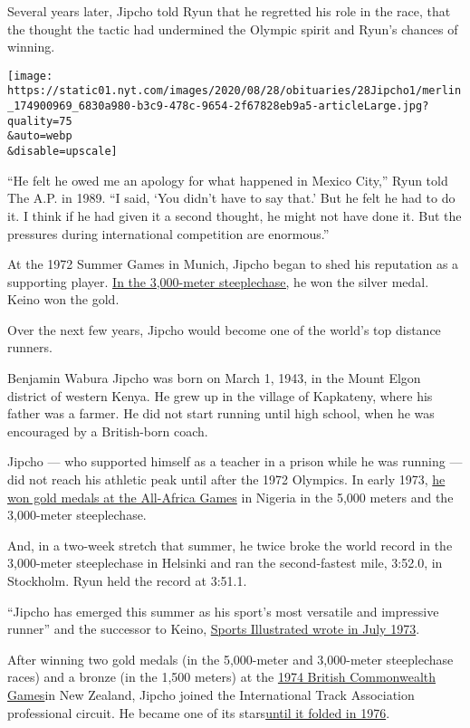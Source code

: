 Several years later, Jipcho told Ryun that he regretted his role in the
race, that the thought the tactic had undermined the Olympic spirit and
Ryun's chances of winning.

\texttt{[image: https://static01.nyt.com/images/2020/08/28/obituaries/28Jipcho1/merlin\_174900969\_6830a980-b3c9-478c-9654-2f67828eb9a5-articleLarge.jpg?quality=75\\\&auto=webp\\\&disable=upscale]}

``He felt he owed me an apology for what happened in Mexico City,'' Ryun
told The A.P. in 1989. ``I said, `You didn't have to say that.' But he
felt he had to do it. I think if he had given it a second thought, he
might not have done it. But the pressures during international
competition are enormous.''

At the 1972 Summer Games in Munich, Jipcho began to shed his reputation
as a supporting player.
\href{https://web.archive.org/web/20200417174448/https://www.sports-reference.com/olympics/athletes/ji/ben-jipcho-1.html}{In
the 3,000-meter steeplechase,} he won the silver medal. Keino won the
gold.

Over the next few years, Jipcho would become one of the world's top
distance runners.

Benjamin Wabura Jipcho was born on March 1, 1943, in the Mount Elgon
district of western Kenya. He grew up in the village of Kapkateny, where
his father was a farmer. He did not start running until high school,
when he was encouraged by a British-born coach.

Jipcho --- who supported himself as a teacher in a prison while he was
running --- did not reach his athletic peak until after the 1972
Olympics. In early 1973,
\href{https://en.wikipedia.org/wiki/Athletics_at_the_1973_All-Africa_Games}{he
won gold medals at the All-Africa Games} in Nigeria in the 5,000 meters
and the 3,000-meter steeplechase.

And, in a two-week stretch that summer, he twice broke the world record
in the 3,000-meter steeplechase in Helsinki and ran the second-fastest
mile, 3:52.0, in Stockholm. Ryun held the record at 3:51.1.

``Jipcho has emerged this summer as his sport's most versatile and
impressive runner'' and the successor to Keino,
\href{https://vault.si.com/vault/1973/07/30/jipcho-is-hitting-his-stride}{Sports
Illustrated wrote in July 1973}.

After winning two gold medals (in the 5,000-meter and 3,000-meter
steeplechase races) and a bronze (in the 1,500 meters) at the
\href{https://en.wikipedia.org/wiki/Athletics_at_the_1974_British_Commonwealth_Games\#:~:text=The\%20QE\%20II\%20Park\%20was\%20purpose\%2Dbuilt\%20for\%20the\%201974\%20Games.\&text=At\%20the\%201974\%20British\%20Commonwealth\%20Games\%2C\%20the\%20athletics\%20events\%20were,25\%20January\%20and\%202\%20February.}{1974
British Commonwealth Games}in New Zealand, Jipcho joined the
International Track Association professional circuit. He became one of
its
stars\href{http://www.thesportsexaminer.com/lane-one-echoes-of-the-failed-intl-track-association-in-the-new-intl-swimming-league/}{until
it folded in 1976}.

